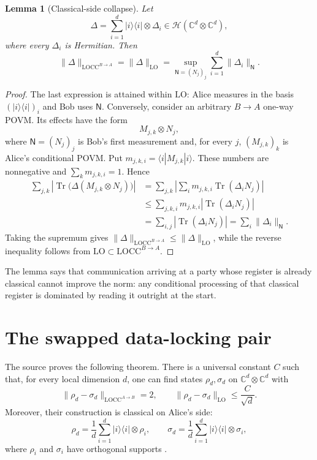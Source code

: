 \documentclass[11pt]{article}
\newtheorem{lemma}{Lemma}
\newcommand{\C}{\mathbb C}
\newcommand{\Hh}{\mathcal H}
\newcommand{\LO}{\mathrm{LO}}
\newcommand{\LOCC}{\mathrm{LOCC}}
\newcommand{\tr}{\operatorname{Tr}}
\begin{document}
\begin{lemma}[Classical-side collapse]\label{lem:collapse}
Let
\[
        \Delta=\sum_{i=1}^d |i\rangle\!\langle i|\otimes\Delta_i
        \in\Hh(\C^d\otimes\C^d),                         \tag{2}
\]
where every $\Delta_i$ is Hermitian.  Then
\[
 \|\Delta\|_{\LOCC^{B\to A}}
 =\|\Delta\|_{\LO}
 =\sup_{\mathsf N=(N_j)_j}\sum_{i=1}^d
                         \|\Delta_i\|_{\mathsf N}.        \tag{3}
\]
\end{lemma}

\begin{proof}
The last expression is attained within $\LO$: Alice measures in the basis
$(|i\rangle\!\langle i|)_i$ and Bob uses $\mathsf N$.  Conversely, consider
an arbitrary $B\to A$ one-way POVM.  Its effects have the form
\[
                         M_{j,k}\otimes N_j,
\]
where $\mathsf N=(N_j)_j$ is Bob's first measurement and, for every $j$,
$(M_{j,k})_k$ is Alice's conditional POVM.  Put
$m_{j,k,i}=\langle i|M_{j,k}|i\rangle$.  These numbers are nonnegative and
$\sum_km_{j,k,i}=1$.  Hence
\begin{align*}
 \sum_{j,k}\left|\tr\bigl(\Delta(M_{j,k}\otimes N_j)\bigr)\right|
 &=\sum_{j,k}\left|\sum_i m_{j,k,i}\tr(\Delta_iN_j)\right|\\
 &\leq\sum_{j,k,i}m_{j,k,i}|\tr(\Delta_iN_j)|\\
 &=\sum_{i,j}|\tr(\Delta_iN_j)|
   =\sum_i\|\Delta_i\|_{\mathsf N}.
\end{align*}
Taking the supremum gives
$\|\Delta\|_{\LOCC^{B\to A}}\leq\|\Delta\|_{\LO}$, while the reverse
inequality follows from $\LO\subset\LOCC^{B\to A}$.
\end{proof}

The lemma says that communication arriving at a party whose register is
already classical cannot improve the norm: any conditional processing of
that classical register is dominated by reading it outright at the start.

\section{The swapped data-locking pair}

The source proves the following theorem.  There is a universal constant $C$
such that, for every local dimension $d$, one can find states $\rho_d,\sigma_d$
on $\C^d\otimes\C^d$ with
\[
 \|\rho_d-\sigma_d\|_{\LOCC^{A\to B}}=2,
 \qquad
 \|\rho_d-\sigma_d\|_{\LO}\leq\frac{C}{\sqrt d}.        \tag{4}
\]
Moreover, their construction is classical on Alice's side:
\[
 \rho_d=\frac1d\sum_{i=1}^d|i\rangle\!\langle i|\otimes\rho_i,
 \qquad
 \sigma_d=\frac1d\sum_{i=1}^d|i\rangle\!\langle i|\otimes\sigma_i,       \tag{5}
\]
where $\rho_i$ and $\sigma_i$ have orthogonal supports \cite[Theorem 3]{AL}.
\end{document}
